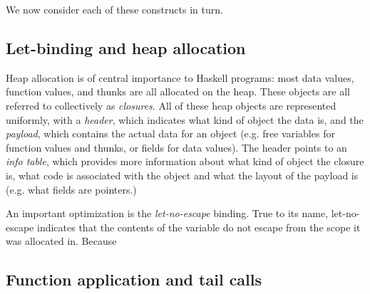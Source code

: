 We now consider each of these constructs in turn.

\subsection{Let-binding and heap allocation}

Heap allocation is of central importance to Haskell programs: most data
values, function values, and thunks are all allocated on the heap.  These objects are
all referred to collectively as \emph{closures}.  All of these heap
objects are represented uniformly, with a \emph{header}, which indicates
what kind of object the data is, and the \emph{payload}, which contains
the actual data for an object (e.g. free variables for function values
and thunks, or fields for data values).  The header points to an
\emph{info table}, which provides more information about what kind of
object the closure is, what code is associated with the object and what
the layout of the payload is (e.g. what fields are pointers.)

An important optimization is the \emph{let-no-escape} binding.  True
to its name, let-no-escape indicates that the contents of the variable
do not escape from the scope it was allocated in.  Because 

\subsection{Function application and tail calls}




